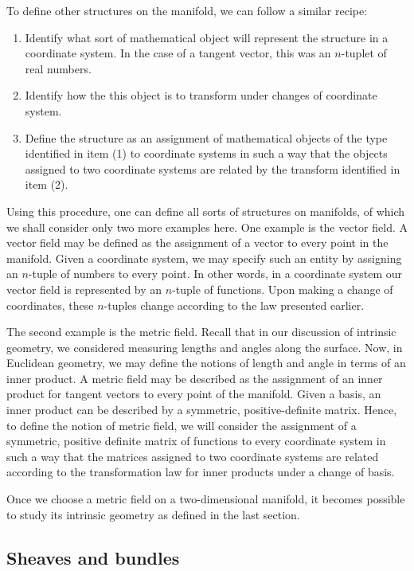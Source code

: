 \documentclass[12pt]{article}
\begin{document}
To define other structures on the manifold, we can follow a similar recipe:  
\begin{enumerate}
\item  Identify what sort of mathematical object will represent the
structure in a coordinate system.  In the case of a tangent vector,
this was an $n$-tuplet of real numbers.
\item  Identify how the this object is to transform under changes of
coordinate system.
\item  Define the structure as an assignment of mathematical objects
of the type  identified in item (1) to coordinate systems in such a
way that the objects assigned to two coordinate systems are related by
the transform identified in item (2).
\end{enumerate}

Using this procedure, one can define all sorts of structures on
manifolds, of which we shall consider only two more examples here.
One example is the vector field.  A vector field may be defined as the
assignment of a vector to every point in the manifold.  Given a
coordinate system, we may specify such an entity by assigning an
$n$-tuple of numbers to every point.  In other words, in a coordinate
system our vector field is represented by an $n$-tuple of functions.
Upon making a change of coordinates, these $n$-tuples change according
to the law presented earlier.

The second example is the metric field.  Recall that in our discussion
of intrinsic geometry, we considered measuring lengths and angles
along the surface.  Now, in Euclidean geometry, we may define the
notions of length and angle in terms of an inner product.  A metric
field may be described as the assignment of an inner product for
tangent vectors to every point of the manifold.  Given a basis, an
inner product can be described by a symmetric, positive-definite
matrix.  Hence, to define the notion of metric field, we will consider
the assignment of a symmetric, positive definite matrix of functions
to every coordinate system in such a way that the matrices assigned to
two coordinate systems are related according to the transformation law
for inner products under a change of basis.

Once we choose a metric field on a two-dimensional manifold, it
becomes possible to study its intrinsic geometry as defined in the
last section.

\subsection{Sheaves and bundles}
\end{document}
